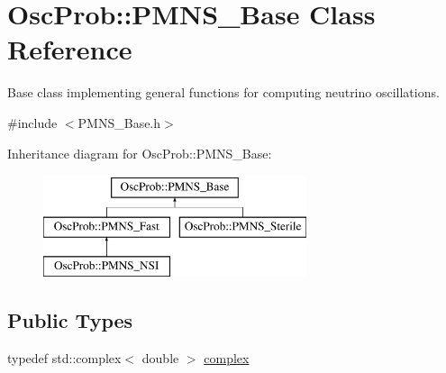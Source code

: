 \hypertarget{classOscProb_1_1PMNS__Base}{}\section{Osc\+Prob\+:\+:P\+M\+N\+S\+\_\+\+Base Class Reference}
\label{classOscProb_1_1PMNS__Base}


Base class implementing general functions for computing neutrino oscillations.  




{\ttfamily \#include $<$P\+M\+N\+S\+\_\+\+Base.\+h$>$}

Inheritance diagram for Osc\+Prob\+:\+:P\+M\+N\+S\+\_\+\+Base\+:\begin{figure}[H]
\begin{center}
\leavevmode
\includegraphics[height=3.000000cm]{classOscProb_1_1PMNS__Base}
\end{center}
\end{figure}
\subsection*{Public Types}
\begin{DoxyCompactItemize}
\item 
typedef std\+::complex$<$ double $>$ \hyperlink{classOscProb_1_1PMNS__Base_ae86ec4718808ce9d02e5f5b4226714ab}{complex}
\end{DoxyCompactItemize}
